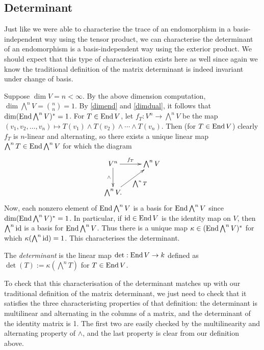 \subsection{Determinant}

Just like we were able to characterise the trace of an endomorphism in a basis-independent way using the tensor product, we can characterise the determinant of an endomorphism is a basis-independent way using the exterior product. We should expect that this type of characterisation exists here as well since again we know the traditional definition of the matrix determinant is indeed invariant under change of basis.

\begin{rem}
Suppose $\dim V = n < \infty$. By the above dimension computation, $\dim \bigwedge^n V = \binom nn = 1$. By \ref{dimend} and \ref{dimdual}, it follows that $\dim (\operatorname{End} \bigwedge^n V)^* = 1$. For $T \in \operatorname{End} V$, let $f_T : V^n \to \bigwedge^n V$ be the map $(v_1,v_2,\ldots,v_n) \mapsto T(v_1) \wedge T(v_2) \wedge \cdots \wedge T(v_n)$. Then (for $T \in \operatorname{End} V$) clearly $f_T$ is $n$-linear and alternating, so there exists a unique linear map $\bigwedge^n T \in \operatorname{End} \bigwedge^n V$ for which the diagram
\[ \xymatrix{ V^n \ar[r]^-{f_T} \ar[d]_-\wedge & \bigwedge^n V \\ \bigwedge^n V \ar[ur]_-{\bigwedge^n T}. } \]
Now, each nonzero element of $\operatorname{End} \bigwedge^n V$ is a basis for $\operatorname{End} \bigwedge^n V$ since $\dim (\operatorname{End} \bigwedge^n V)^* = 1$. In particular, if $\operatorname{id} \in \operatorname{End} V$ is the identity map on $V$, then $\bigwedge^n \operatorname{id}$ is a basis for $\operatorname{End}\bigwedge^n V$. Thus there is a unique map $\kappa \in (\operatorname{End}\bigwedge^n V)^*$ for which $\kappa(\bigwedge^n \operatorname{id}) = 1$. This characterises the determinant.
\end{rem}

\begin{dfn}
  The \textit{determinant} is the linear map $\det : \operatorname{End} V \to k$ defined as $\det(T) := \kappa(\bigwedge^n T)$ for $T \in \operatorname{End} V$.
\end{dfn}

\begin{rem}
To check that this characterisation of the determinant matches up with our traditional definition of the matrix determinant, we just need to check that it satisfies the three characteristing properties of that definition: the determinant is multilinear and alternating in the columns of a matrix, and the determinant of the identity matrix is 1. The first two are easily checked by the multilinearity and alternating property of $\wedge$, and the last property is clear from our definition above. 
\end{rem}

